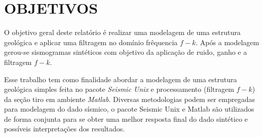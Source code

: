 \chapter{OBJETIVOS}
\label{cap1}

O objetivo geral deste relatório é realizar uma modelagem de uma estrutura geológica e aplicar uma filtragem no domínio frêquencia $f-k$. Após a modelagem gerou-se sismogramas sintéticos com objetivo da aplicação de ruido, ganho e a filtragem $f-k$. 

Esse trabalho tem como finalidade abordar a modelagem de uma estrutura geológica simples feita no pacote \textit{Seismic Unix} e processamento (filtragem $f-k$) da seção tiro em ambiente \textit{Matlab}. Diversas metodologias podem ser empregadas para modelagem do dado sísmico, o pacote Seismic Unix e Matlab são utilizados de forma conjunta para se obter uma melhor resposta final do dado sintético e possíveis interpretações dos resultados. 




